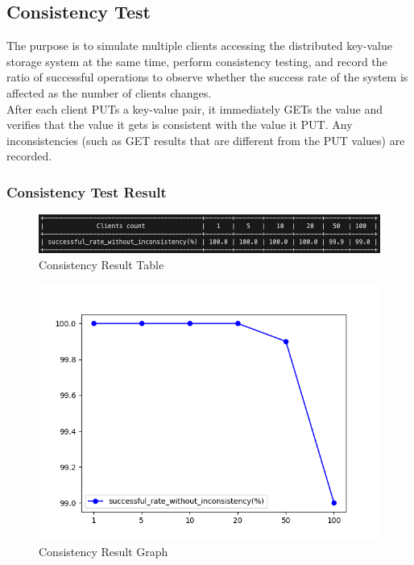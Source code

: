 \documentclass{article}
\begin{document}
\subsection{Consistency Test}
The purpose is to simulate multiple clients accessing the distributed key-value storage system at the same time, perform consistency testing, and record the ratio of successful operations to observe whether the success rate of the system is affected as the number of clients changes.\\
After each client PUTs a key-value pair, it immediately GETs the value and verifies that the value it gets is consistent with the value it PUT. Any inconsistencies (such as GET results that are different from the PUT values) are recorded.

\subsubsection{Consistency Test Result}
\begin{figure}[H]  
    \centering
    \includegraphics[width=1\textwidth]{ptn_consistency_output_table.png}  %
    \caption{Consistency Result Table}
\end{figure}
\begin{figure}[H]  
    \centering
    \includegraphics[width=1\textwidth]{ptn_consistency_output_plot.png}  %
    \caption{Consistency Result Graph}
\end{figure}
\end{document}
